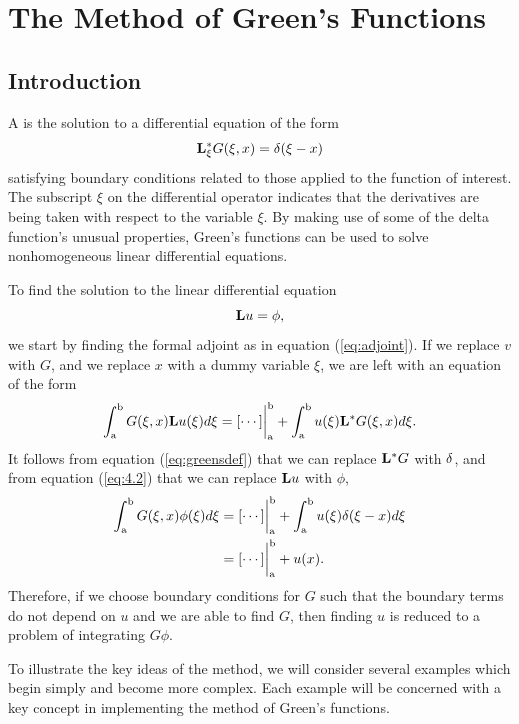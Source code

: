 \section{The Method of Green's Functions}
\setcounter{example}{0}
\subsection{Introduction}
    A  is the solution to a differential equation of the form
    \begin{equation} \label{eq:greensdef}
        \mathrm{\bf{L^*_\xi}} G(\xi, x) = \delta(\xi - x)
    \end{equation}
    satisfying boundary conditions related to those applied to the function of interest.
    The subscript \(\xi\) on the differential operator indicates that the derivatives are being taken with respect to the variable \(\xi\). By making use of some of the delta function's unusual properties, Green's functions can be used to solve nonhomogeneous linear differential equations.

    To find the solution to the linear differential equation
    \begin{equation} \label{eq:4.2}
        \mathrm{\bf{L}}u=\phi,
    \end{equation}
    we start by finding the formal adjoint as in equation (\ref{eq:adjoint}). If we replace \(v\) with \(G\), and we replace \(x\) with a dummy variable \(\xi\), we are left with an equation of the form
    \begin{equation} \label{eq:greenadjoint}
        \int_\mathrm{a}^\mathrm{b} G(\xi, x)\mathrm{\bf{L}}u(\xi) d\xi = [\cdots]\biggr\rvert_\mathrm{a}^\mathrm{b} + \int_\mathrm{a}^\mathrm{b} u(\xi)\mathrm{\bf{L^*}}G(\xi,x) d\xi.
    \end{equation} 
    It follows from equation (\ref{eq:greensdef}) that we can replace \(\mathrm{\bf{L^*}}G\) with \(\delta\), and from equation (\ref{eq:4.2}) that we can replace \(\mathrm{\bf{L}}u\) with \(\phi\), 
    \begin{equation}
        \begin{split}
            \int_\mathrm{a}^\mathrm{b} G(\xi,x)\phi(\xi) d\xi &= [\cdots]\biggr\rvert_\mathrm{a}^\mathrm{b} + \int_\mathrm{a}^\mathrm{b} u(\xi)\delta(\xi-x) d\xi\\
            &=[\cdots]\biggr\rvert_\mathrm{a}^\mathrm{b} + u(x).
        \end{split}
    \end{equation}
    Therefore, if we choose boundary conditions for \(G\) such that the boundary terms do not depend on \(u\) and we are able to find \(G\), then finding \(u\) is reduced to a problem of integrating \(G\phi\). 

    To illustrate the key ideas of the method, we will consider several examples which begin simply and become more complex. Each example will be concerned with a key concept in implementing the method of Green's functions.

